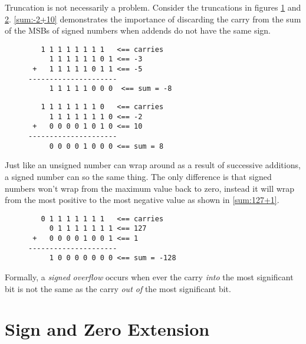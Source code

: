 Truncation is not necessarily a problem.  Consider the truncations in
figures \ref{sum:-3+-5} and \ref{sum:-2+10}.  
\autoref{sum:-2+10} demonstrates the importance of discarding 
the carry from the sum of the MSBs of signed numbers when addends
do not have the same sign.

\begin{figure}[H]
\centering
\begin{BVerbatim}
   1 1 1 1 1 1 1 1   <== carries
     1 1 1 1 1 1 0 1 <== -3
 +   1 1 1 1 1 0 1 1 <== -5
---------------------
     1 1 1 1 1 0 0 0  <== sum = -8
\end{BVerbatim}
\label{sum:-3+-5}
\end{figure}

\begin{figure}[H]
\centering
\begin{BVerbatim}
   1 1 1 1 1 1 1 0   <== carries
     1 1 1 1 1 1 1 0 <== -2
 +   0 0 0 0 1 0 1 0 <== 10
---------------------
     0 0 0 0 1 0 0 0 <== sum = 8
\end{BVerbatim}
\label{sum:-2+10}
\end{figure}

Just like an unsigned number can wrap around as a result of
successive additions, a signed number can so the same thing.  The
only difference is that signed numbers won't wrap from the maximum 
value back to zero, instead it will wrap from the most positive to 
the most negative value as shown in \autoref{sum:127+1}.
 
\begin{figure}[H]
\centering
\begin{BVerbatim}
   0 1 1 1 1 1 1 1   <== carries
     0 1 1 1 1 1 1 1 <== 127
 +   0 0 0 0 1 0 0 1 <== 1
---------------------
     1 0 0 0 0 0 0 0 <== sum = -128
\end{BVerbatim}
\label{sum:127+1}
\end{figure}

\begin{tcolorbox}
Formally, a {\em signed overflow} occurs when ever the carry
{\em into} the most significant bit is not the same as the 
carry {\em out of} the most significant bit.  
\end{tcolorbox}

\section{Sign and Zero Extension}

